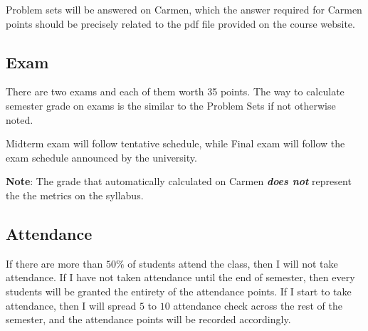 \documentclass[12pt]{article}
\begin{document}
Problem sets will be answered on Carmen, which the answer required for Carmen points should be precisely related to the pdf file provided on the course website.

\subsection*{Exam}
\label{sub:Exam}

There are two exams and each of them worth 35 points.
The way to calculate semester grade on exams is the similar to the Problem Sets if not otherwise noted.

Midterm exam will follow tentative schedule, while Final exam will follow the exam schedule announced by the university.

\textbf{Note}: The grade that automatically calculated on Carmen \textbf{\textit{does not}} represent the the metrics on the syllabus.

\subsection*{Attendance}
\label{sub:Attendance}

If there are more than $ 50\% $ of students attend the class, then I will not take attendance.
If I have not taken attendance until the end of semester, then every students will be granted the entirety of the attendance points.
If I start to take attendance, then I will spread $ 5 $ to $ 10 $ attendance check across the rest of the semester, and the attendance points will be recorded accordingly.





\end{document}
